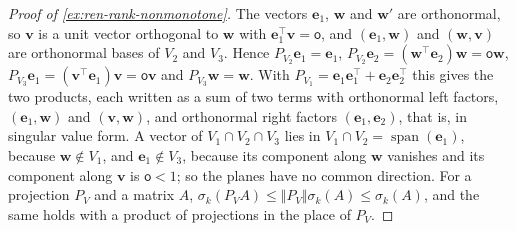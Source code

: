 \begin{proof}[Proof of \cref{ex:ren-rank-nonmonotone}]
The vectors $\mathbf e_1$, $\mathbf w$ and $\mathbf w'$ are orthonormal, so $\mathbf v$ is a unit vector orthogonal to $\mathbf w$ with $\mathbf e_1^\top\mathbf v=\mathsf o$, and $(\mathbf e_1,\mathbf w)$ and $(\mathbf w,\mathbf v)$ are orthonormal bases of $V_2$ and $V_3$. Hence $P_{V_2}\mathbf e_1=\mathbf e_1$, $P_{V_2}\mathbf e_2=(\mathbf w^\top\mathbf e_2)\mathbf w=\mathsf o\mathbf w$, $P_{V_3}\mathbf e_1=(\mathbf v^\top\mathbf e_1)\mathbf v=\mathsf o\mathbf v$ and $P_{V_3}\mathbf w=\mathbf w$. With $P_{V_1}=\mathbf e_1\mathbf e_1^\top+\mathbf e_2\mathbf e_2^\top$ this gives the two products, each written as a sum of two terms with orthonormal left factors, $(\mathbf e_1,\mathbf w)$ and $(\mathbf v,\mathbf w)$, and orthonormal right factors $(\mathbf e_1,\mathbf e_2)$, that is, in singular value form. A vector of $V_1\cap V_2\cap V_3$ lies in $V_1\cap V_2=\operatorname{span}(\mathbf e_1)$, because $\mathbf w\notin V_1$, and $\mathbf e_1\notin V_3$, because its component along $\mathbf w$ vanishes and its component along $\mathbf v$ is $\mathsf o<1$; so the planes have no common direction. For a projection $P_V$ and a matrix $A$, $\sigma_k(P_VA)\le\Vert P_V\Vert\sigma_k(A)\le\sigma_k(A)$, and the same holds with a product of projections in the place of $P_V$.


\end{proof}
